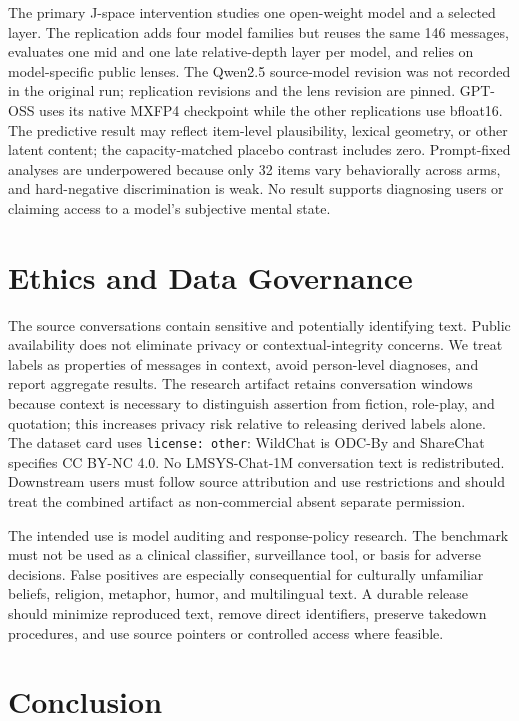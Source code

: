\documentclass{article}
\begin{document}
The primary J-space intervention studies one open-weight model and a selected layer. The replication adds four model families but reuses the same 146 messages, evaluates one mid and one late relative-depth layer per model, and relies on model-specific public lenses. The Qwen2.5 source-model revision was not recorded in the original run; replication revisions and the lens revision are pinned. GPT-OSS uses its native MXFP4 checkpoint while the other replications use bfloat16. The predictive result may reflect item-level plausibility, lexical geometry, or other latent content; the capacity-matched placebo contrast includes zero. Prompt-fixed analyses are underpowered because only 32 items vary behaviorally across arms, and hard-negative discrimination is weak. No result supports diagnosing users or claiming access to a model's subjective mental state.

\section{Ethics and Data Governance}
\label{sec:ethics}

The source conversations contain sensitive and potentially identifying text. Public availability does not eliminate privacy or contextual-integrity concerns. We treat labels as properties of messages in context, avoid person-level diagnoses, and report aggregate results. The research artifact retains conversation windows because context is necessary to distinguish assertion from fiction, role-play, and quotation; this increases privacy risk relative to releasing derived labels alone. The dataset card uses \texttt{license: other}: WildChat is ODC-By and ShareChat specifies CC BY-NC 4.0. No LMSYS-Chat-1M conversation text is redistributed. Downstream users must follow source attribution and use restrictions and should treat the combined artifact as non-commercial absent separate permission.

The intended use is model auditing and response-policy research. The benchmark must not be used as a clinical classifier, surveillance tool, or basis for adverse decisions. False positives are especially consequential for culturally unfamiliar beliefs, religion, metaphor, humor, and multilingual text. A durable release should minimize reproduced text, remove direct identifiers, preserve takedown procedures, and use source pointers or controlled access where feasible.

\section{Conclusion}
\end{document}
